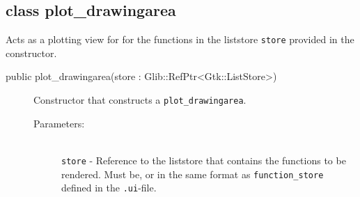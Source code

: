 \documentclass[a4paper,11pt]{kth-mag}
\begin{document}
\subsection{class plot\_drawingarea}
Acts as a plotting view for for the functions in the liststore \texttt{store}
provided in the constructor.

\begin{description}
    \item[public plot\_drawingarea(store : Glib::RefPtr<Gtk::ListStore>)] Constructor 
    that constructs a \texttt{plot\_drawingarea}. 
    \begin{description}
        \item[Parameters:]~\\
            \verb+store+ - Reference to the liststore that contains the
            functions to be rendered. Must be, or in the same format as
            \texttt{function\_store} defined in the \texttt{.ui}-file.
    \end{description}
\end{description}
\end{document}
